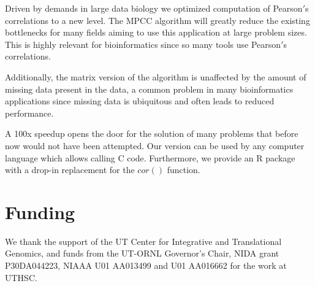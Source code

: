 \documentclass{bioinfo}
\begin{document}
Driven by demands in large data biology we optimized computation of Pearson$'$s 
correlations to a new level. The MPCC algorithm will greatly reduce the 
existing bottlenecks for many fields aiming to use this application at large 
problem sizes. This is highly relevant for bioinformatics since so many 
tools use Pearson$'$s correlations. 

Additionally, the matrix version of the algorithm is unaffected by the 
amount of missing data present in the data, a common problem in many 
bioinformatics applications since missing data is ubiquitous and often 
leads to reduced performance.

A 100x speedup opens the door for the solution of many problems that before now would not have been attempted.  
Our version can be used by any computer language which allows 
calling C code. Furthermore, we provide an R package with a drop-in replacement 
for the $cor()$ function.

\section*{Funding}

We thank the support of the UT Center for Integrative and Translational Genomics, 
and funds from the UT-ORNL Governor's Chair, NIDA grant P30DA044223, NIAAA U01 
AA013499 and U01 AA016662 for the work at UTHSC. \vspace*{-12pt}


%
%
%
%

%

\end{document}
